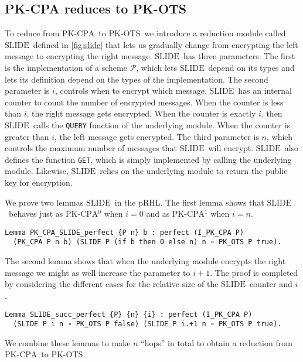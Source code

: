 \documentclass[a4paper,USenglish,cleveref, autoref]{lipics-v2021}
\newcommand{\M}[1]{\texttt{#1}}
\renewcommand{\P}{\mathcal{P}}
\newcommand{\CPA}{\ensuremath{\mathrm{PK\text{-}CPA}}}
\newcommand{\OTS}{\ensuremath{\mathrm{PK\text{-}OTS}}}
\newcommand{\SLIDE}{\ensuremath{\mathrm{SLIDE}}}
\begin{document}
\subsection{PK-CPA reduces to PK-OTS} \label{sec:cpaots}

To reduce from \CPA\ to \OTS\ we introduce a reduction module called
\SLIDE\ defined in \cref{fig:slide} that lets us
gradually change from encrypting the left
message to encrypting the right message.
\SLIDE\ has three parameters.
The first is the implementation of a scheme $\P$, which lets
\SLIDE\ depend on its types and lets its definition depend on the types
of the implementation.
The second parameter is $i$, controls when to encrypt which message.
\SLIDE\ has an internal counter to count the number of encrypted messages.
When the counter is less than $i$, the right message gets encrypted.
When the counter is exactly $i$, then \SLIDE\ calls the \M{QUERY} function of the underlying module.
When the counter is greater than $i$, the left message gets encrypted.
The third parameter is $n$, which controls the maximum number of messages
that \SLIDE\ will encrypt.
\SLIDE\ also defines the function \M{GET}, which is simply implemented by
calling the underlying module. Likewise, \SLIDE\ relies on the underlying
module to return the public key for encryption.

We prove two lemmas \SLIDE\ in the pRHL.
The first lemma shows that \SLIDE\ behaves just as \CPA$^0$ when $i = 0$
and as \CPA$^1$ when $i = n$.

\begin{verbatim}
Lemma PK_CPA_SLIDE_perfect {P n} b : perfect (I_PK_CPA P)
  (PK_CPA P n b) (SLIDE P (if b then 0 else n) n ∘ PK_OTS P true).
\end{verbatim}

The second lemma shows that when the underlying module encrypts the
right message we might as well increase the parameter to $i+1$.
The proof is completed by considering the different cases for the
relative size of the \SLIDE\ counter and $i$.

\begin{verbatim}
Lemma SLIDE_succ_perfect {P} {n} {i} : perfect (I_PK_CPA P)
  (SLIDE P i n ∘ PK_OTS P false) (SLIDE P i.+1 n ∘ PK_OTS P true).
\end{verbatim}

We combine these lemmas to make $n$ ``hops'' in total
to obtain a reduction from \CPA\ to \OTS.
\end{document}
